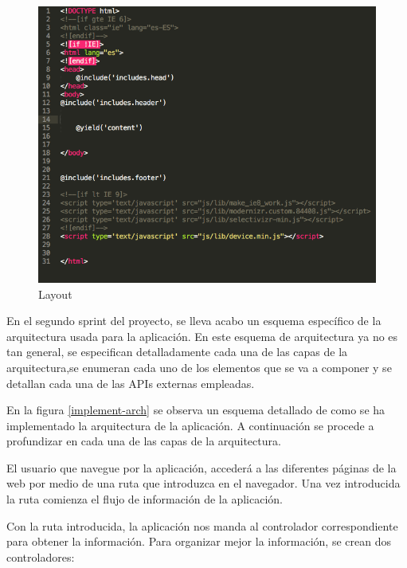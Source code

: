 \begin{figure}
\begin{center}
\includegraphics[width=1.0\textwidth]{imagenes/layout.png}
\caption{Layout}
\label{layout}
\end{center}
\end{figure}

En el segundo sprint del proyecto, se lleva acabo un esquema específico de la arquitectura usada para la aplicación. En este esquema de arquitectura ya no es tan general, se especifican detalladamente cada una de las capas de la arquitectura,se enumeran cada uno de los elementos que se va a componer y se detallan cada una de las APIs externas empleadas.

\vspace{5 mm}

En la figura \ref{implement-arch} se observa un esquema detallado de como se ha implementado la arquitectura de la aplicación. A continuación se procede a profundizar en cada una de las capas de la arquitectura.

\vspace{5 mm}

El usuario que navegue por la aplicación, accederá a las diferentes páginas de la web por medio de una ruta que introduzca en el navegador. Una vez introducida la ruta comienza el flujo de información de la aplicación.

\vspace{5 mm}

Con la ruta introducida, la aplicación nos manda al controlador correspondiente para obtener la información. Para organizar mejor la información, se crean dos controladores:

